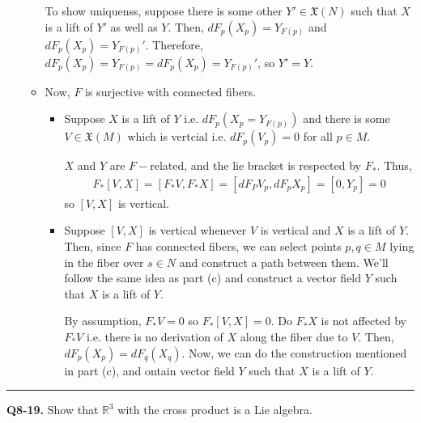 \documentclass{article}
\newcommand{\R}{\mathbb{R}}
\begin{document}
\begin{enumerate}[label=(\alph*)]
\begin{itemize}
    
    To show uniquenss, suppose there is some other $Y' \in \mathfrak{X}(N)$ such that $X$ is a lift of $Y'$ as well as $Y$. Then, $dF_p(X_p) = Y_{F(p)}$ and $dF_p(X_p) = Y_{F(p)}'$. Therefore, $dF_p(X_p) = Y_{F(p)} = dF_p(X_p) = Y_{F(p)}'$, so $Y'= Y$.
    
    \vskip 1cm
    \item Now, $F$ is surjective with connected fibers. 
    \begin{itemize}
      \item Suppose $X$ is a lift of $Y$ i.e. $dF_p(X_p = Y_{F(p)})$ and there is some $V \in \mathfrak{X}(M)$ which is vertcial i.e. $dF_p(V_p) = 0$ for all $p \in M$.
      
      $X$ and $Y$ are $F-$related, and the lie bracket is respected by $F_*$. Thus, 
      \begin{align*}
        F_*\left[V, X\right] = \left[F_* V, F_* X\right] = \left[dF_PV_p, dF_p X_p\right] = \left[0, Y_p\right] = 0
      \end{align*}
      so $[V, X]$ is vertical.

      \vskip 0.5cm
      \item Suppose $[V, X]$ is vertical whenever $V$ is vertical and $X$ is a lift of $Y$. Then, since $F$ has connected fibers, we can select points $p, q \in M$ lying in the fiber over $s \in N$ and construct a path between them. We'll follow the same idea as part (c) and construct a vector field $Y$ such that $X$ is a lift of $Y$.
      
      
      By assumption, $F_* V = 0$ so $F_*[V, X] = 0$. Do $F_*X$ is not affected by $F_* V$ i.e. there is no derivation of $X$ along the fiber due to $V$. Then, $dF_p(X_p) = dF_q(X_q)$. Now, we can do the construction mentioned in part (c), and ontain vector field $Y$ such that $X$ is a lift of $Y$.
    \end{itemize}
  \end{itemize}
\end{enumerate}

\vskip 0.5cm
\hrule 
\vskip 0.5cm



\textbf{Q8-19.} Show that $\R^3$ with the cross product is a Lie algebra.
\end{document}
